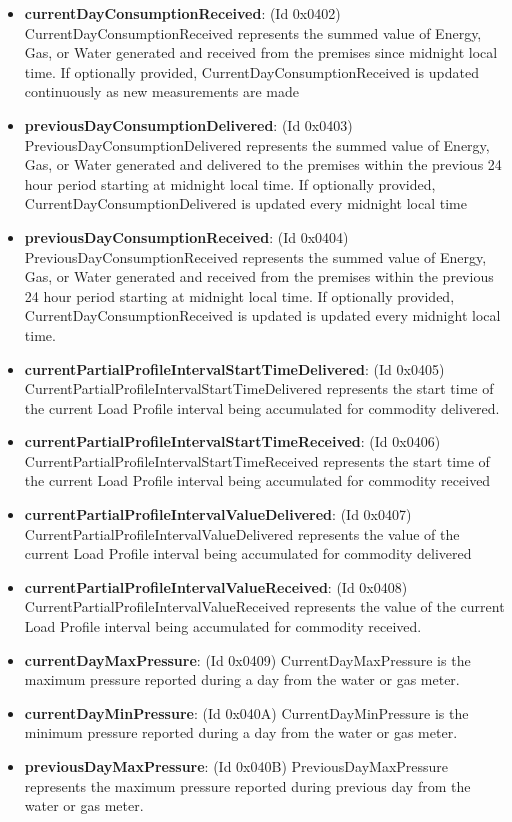 \begin{itemize}
\item \textbf{currentDayConsumptionReceived}: (Id 0x0402) CurrentDayConsumptionReceived represents the summed value of Energy, Gas, or Water generated and received from the premises since midnight local time. If optionally provided, CurrentDayConsumptionReceived is updated continuously as new measurements are made
\item \textbf{previousDayConsumptionDelivered}: (Id 0x0403) PreviousDayConsumptionDelivered represents the summed value of Energy, Gas, or Water generated and delivered to the premises within the previous 24 hour period starting at midnight local time. If optionally provided, CurrentDayConsumptionDelivered is updated every midnight local time
\item \textbf{previousDayConsumptionReceived}: (Id 0x0404) PreviousDayConsumptionReceived represents the summed value of Energy, Gas, or Water generated and received from the premises within the previous 24 hour period starting at midnight local time. If optionally provided, CurrentDayConsumptionReceived is updated is updated every midnight local time.
\item \textbf{currentPartialProfileIntervalStartTimeDelivered}: (Id 0x0405) CurrentPartialProfileIntervalStartTimeDelivered represents the start time of the current Load Profile interval being accumulated for commodity delivered.
\item \textbf{currentPartialProfileIntervalStartTimeReceived}: (Id 0x0406) CurrentPartialProfileIntervalStartTimeReceived represents the start time of the current Load Profile interval being accumulated for commodity received
\item \textbf{currentPartialProfileIntervalValueDelivered}: (Id 0x0407) CurrentPartialProfileIntervalValueDelivered represents the value of the current Load Profile interval being accumulated for commodity delivered
\item \textbf{currentPartialProfileIntervalValueReceived}: (Id 0x0408) CurrentPartialProfileIntervalValueReceived represents the value of the current Load Profile interval being accumulated for commodity received.
\item \textbf{currentDayMaxPressure}: (Id 0x0409) CurrentDayMaxPressure is the maximum pressure reported during a day from the water or gas meter.
\item \textbf{currentDayMinPressure}: (Id 0x040A) CurrentDayMinPressure is the minimum pressure reported during a day from the water or gas meter.
\item \textbf{previousDayMaxPressure}: (Id 0x040B) PreviousDayMaxPressure represents the maximum pressure reported during previous day from the water or gas meter.

\end{itemize}
